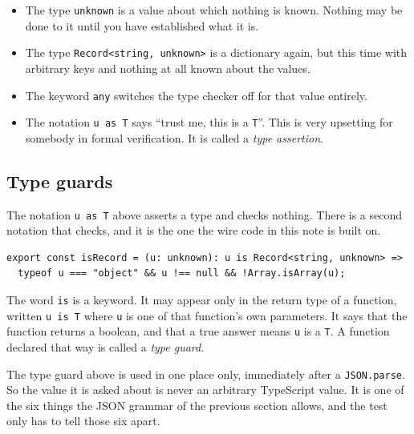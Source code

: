 \documentclass[11pt,a4paper]{article}
\begin{document}
\begin{listbox}
\begin{itemize}\setlength{\itemsep}{2pt}

\item The type \texttt{unknown} is a value about which nothing is known. Nothing may be done to
      it until you have established what it is.

\item The type \texttt{Record<string, unknown>} is a dictionary again, but this time with
      arbitrary keys and nothing at all known about the values.

\item The keyword \texttt{any} switches the type checker off for that value entirely.

\item The notation \texttt{u as T} says ``trust me, this is a \texttt{T}''. This is very
      upsetting for somebody in formal verification. It is called a \emph{type assertion}.

\end{itemize}
\end{listbox}

\newpage

\subsection{Type guards}
\label{sec:guards}

The notation \texttt{u as T} above asserts a type and checks nothing. There is a second notation
that checks, and it is the one the wire code in this note is built on.

\begin{lstlisting}[language=TS]
export const isRecord = (u: unknown): u is Record<string, unknown> =>
  typeof u === "object" && u !== null && !Array.isArray(u);
\end{lstlisting}

The word \texttt{is} is a keyword. It may appear only in the return type of a function, written
\texttt{u is T} where \texttt{u} is one of that function's own parameters. It says that the function
returns a boolean, and that a true answer means \texttt{u} is a \texttt{T}. A function declared that
way is called a \emph{type guard}.

The type guard above is used in one place only, immediately after a \texttt{JSON.parse}. So the
value it is asked about is never an arbitrary TypeScript value. It is one of the six things the
JSON grammar of the previous section allows, and the test only has to tell those six apart.
\end{document}
